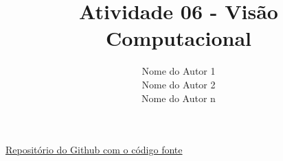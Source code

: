 \documentclass[rascunho,xindy,table]{fei}
\author{
    Nome do Autor 1\\
    Nome do Autor 2\\
    Nome do Autor n\\
}
\title{Atividade 06 - Visão Computacional}
\begin{document}
\maketitle

\href{https://github.com/}{Repositório do Github com o código fonte}


\end{document}
